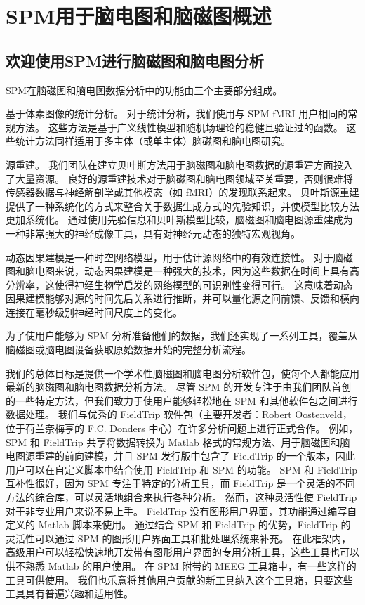 \chapter{SPM用于脑电图和脑磁图概述}


\section{欢迎使用SPM进行脑磁图和脑电图分析}

SPM在脑磁图和脑电图数据分析中的功能由三个主要部分组成。


基于体素图像的统计分析。
对于统计分析，我们使用与 SPM fMRI 用户相同的常规方法。
这些方法是基于广义线性模型和随机场理论的稳健且验证过的函数。
这些统计方法同样适用于多主体（或单主体）脑磁图和脑电图研究。


源重建。
我们团队在建立贝叶斯方法用于脑磁图和脑电图数据的源重建方面投入了大量资源。
良好的源重建技术对于脑磁图和脑电图领域至关重要，否则很难将传感器数据与神经解剖学或其他模态（如 fMRI）的发现联系起来。
贝叶斯源重建提供了一种系统化的方式来整合关于数据生成方式的先验知识，并使模型比较方法更加系统化。
通过使用先验信息和贝叶斯模型比较，脑磁图和脑电图源重建成为一种非常强大的神经成像工具，具有对神经元动态的独特宏观视角。


动态因果建模是一种时空网络模型，用于估计源网络中的有效连接性。
对于脑磁图和脑电图来说，动态因果建模是一种强大的技术，因为这些数据在时间上具有高分辨率，这使得神经生物学启发的网络模型的可识别性变得可行。
这意味着动态因果建模能够对源的时间先后关系进行推断，并可以量化源之间前馈、反馈和横向连接在毫秒级别神经时间尺度上的变化。


为了使用户能够为 SPM 分析准备他们的数据，我们还实现了一系列工具，覆盖从脑磁图或脑电图设备获取原始数据开始的完整分析流程。

我们的总体目标是提供一个学术性脑磁图和脑电图分析软件包，使每个人都能应用最新的脑磁图和脑电图数据分析方法。
尽管 SPM 的开发专注于由我们团队首创的一些特定方法，但我们致力于使用户能够轻松地在 SPM 和其他软件包之间进行数据处理。
我们与优秀的 FieldTrip 软件包（主要开发者：Robert Oostenveld，位于荷兰奈梅亨的 F.C. Donders 中心）在许多分析问题上进行正式合作。
例如，SPM 和 FieldTrip 共享将数据转换为 Matlab 格式的常规方法、用于脑磁图和脑电图源重建的前向建模，并且 SPM 发行版中包含了 FieldTrip 的一个版本，因此用户可以在自定义脚本中结合使用 FieldTrip 和 SPM 的功能。
SPM 和 FieldTrip 互补性很好，因为 SPM 专注于特定的分析工具，而 FieldTrip 是一个灵活的不同方法的综合库，可以灵活地组合来执行各种分析。
然而，这种灵活性使 FieldTrip 对于非专业用户来说不易上手。
FieldTrip 没有图形用户界面，其功能通过编写自定义的 Matlab 脚本来使用。
通过结合 SPM 和 FieldTrip 的优势，FieldTrip 的灵活性可以通过 SPM 的图形用户界面工具和批处理系统来补充。
在此框架内，高级用户可以轻松快速地开发带有图形用户界面的专用分析工具，这些工具也可以供不熟悉 Matlab 的用户使用。
在 SPM 附带的 MEEG 工具箱中，有一些这样的工具可供使用。
我们也乐意将其他用户贡献的新工具纳入这个工具箱，只要这些工具具有普遍兴趣和适用性。


